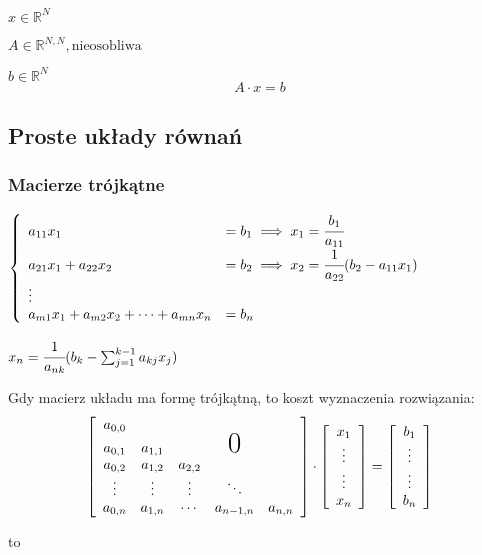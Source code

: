 \documentclass[hidelinks,a4paper,fleqn,oneside]{book}
\newcommand{\RR}{\mathbb{R}}
\begin{document}
$x \in \RR^N$

$A \in \RR^{N,N}, \textrm{nieosobliwa}$

$b \in \RR^N$
\[
	A \cdot x = b
\]

\subsection{Proste układy równań}

\subsubsection{Macierze trójkątne}

$
\left\{
\begin{array}{ll}
	a_{11}x_1                                  & = b_1 \implies x_1 = \cfrac{b_1}{a_{11}}                \\
	a_{21}x_1 + a_{22}x_2                      & = b_2 \implies x_2 = \cfrac{1}{a_{22}}(b_2 - a_{11}x_1) \\
	\vdots \\
	a_{m1}x_1 + a_{m2}x_2 + \cdots + a_{mn}x_n & = b_n                                                   
\end{array}
\right.
$

$x_n = \cfrac{1}{a_{nk}}(b_k - \sum_{j=1}^{k-1} a_{kj}x_j)$

Gdy macierz układu ma formę trójkątną, to koszt wyznaczenia rozwiązania:
\[
	\left[
		\begin{array}{ccccc}
			a_{0,0} \\
			a_{0,1} & a_{1,1}  &   & \text{\huge0}\\
			a_{0,2}  & a_{1,2} & a_{2,2} \\
			\vdots  & \vdots & \vdots & \ddots \\
			a_{0,n} & a_{1,n} & \cdots & a_{n-1,n} & a_{n,n} 
		\end{array}
	\right]
	\cdot
	\left [
		\begin{array}{c}
			x_1 \\  \vdots \\  \vdots \\ x_n
		\end{array}
	\right]
	=
	\left [
		\begin{array}{c}
			b_1 \\ \vdots \\ \vdots \\ b_n
		\end{array}
	\right]
\]

to
\end{document}
